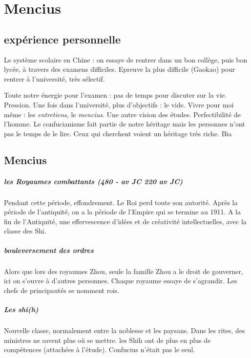\chapter{Mencius}
\section{expérience personnelle}

\begin{singlequote}

Le système scolaire en Chine : on essaye de rentrer dans un bon collège, puis bon lycée, à travers des examens difficiles. Epreuve la plus difficile (Gaokao) pour rentrer à l'université, très sélectif.

Toute notre énergie pour l'examen : pas de temps pour discuter sur la vie. Pression. Une fois dans l'université, plus d'objectifs : le vide. Vivre pour moi même : les \textit{entretiens}, le \textit{mencius}. Une autre vision des études. Perfectibilité de l'homme.  Le confucianisme fait partie de notre héritage mais les personnes n'ont pas le temps de le lire. Ceux qui cherchent voient un héritage très riche.    Bia 
\end{singlequote}


\section{Mencius}

\paragraph{les Royaumes combattants (480 - av JC 220 av JC) } Pendant cette période, effondrement. Le Roi perd toute son autorité. Après la période de l'antiquité, on a la période de l'Empire qui se termine au 1911. A la fin de l'Antiquité, une effervescence d'idées et de créativité intellectuelles, avec la classe des Shi.



\paragraph{bouleversement des ordres}
Alors que lors des royaumes Zhou, seule la famille Zhou a le droit de gouverner, ici on s'ouvre à d'autres personnes. Chaque royaume essaye de s'agrandir.  Les chefs de principautés se nomment rois. 

\paragraph{Les shi(h)} Nouvelle classe, normalement entre la noblesse et les paysans. Dans les rites, des ministres ne savent plus où se mettre. les Shih ont de plus en plus de compétences (attachées à l'étude). Confucius n'était pas le seul.

